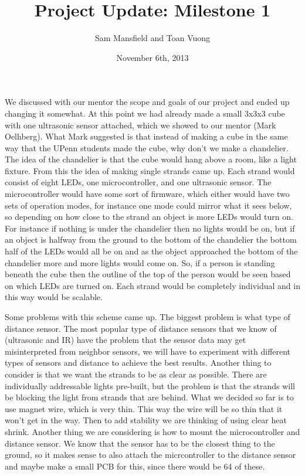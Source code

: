 \documentclass[10pt]{article}
\begin{document}
  \title{Project Update: Milestone 1}
  \author{Sam Mansfield and Toan Vuong}
  \date{November 6th, 2013}
  \maketitle

  We discussed with our mentor the scope and goals of our project and ended up changing it somewhat. At this point we had already made a small 3x3x3 cube with one ultrasonic sensor attached, which we showed to our mentor (Mark Oelhberg). What Mark suggested is that instead of making a cube in the same way that the UPenn students made the cube, why don't we make a chandelier. The idea of the chandelier is that the cube would hang above a room, like a light fixture. From this the idea of making single strands came up. Each strand would consist of eight LEDs, one microcontroller, and one ultrasonic sensor. The microcontroller would have some sort of firmware, which either would have two sets of operation modes, for instance one mode could mirror what it sees below, so depending on how close to the strand an object is more LEDs would turn on. For instance if nothing is under the chandelier then no lights would be on, but if an object is halfway from the ground to the bottom of the chandelier the bottom half of the LEDs would all be on and as the object approached the bottom of the chandelier more and more lights would come on. So, if a person is standing beneath the cube then the outline of the top of the person would be seen based on which LEDs are turned on. Each strand would be completely individual and in this way would be scalable.

  Some problems with this scheme came up. The biggest problem is what type of distance sensor. The most popular type of distance sensors that we know of (ultrasonic and IR) have the problem that the sensor data may get misinterpreted from neighbor sensors, we will have to experiment with different types of sensors and distance to achieve the best results. Another thing to consider is that we want the strands to be as clear as possible. There are individually addressable lights pre-built, but the problem is that the strands will be blocking the light from strands that are behind. What we decided so far is to use magnet wire, which is very thin. This way the wire will be so thin that it won't get in the way. Then to add stability we are thinking of using clear heat shrink. Another thing we are considering is how to mount the microcontroller and distance sensor. We know that the sensor has to be the closest thing to the ground, so it makes sense to also attach the micrcontroller to the distance sensor and maybe make a small PCB for this, since there would be 64 of these.
\end{document}
